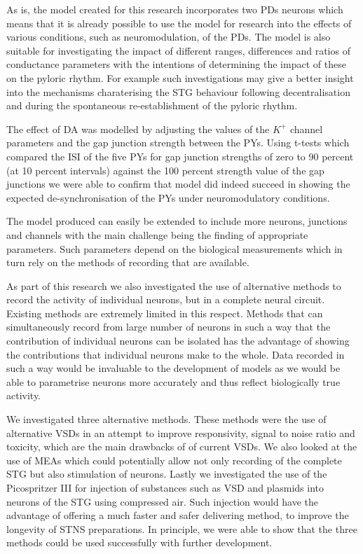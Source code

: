 As is, the model created for this research incorporates two \acp{PD} neurons which means that it is already possible to use the model for research into the effects of various conditions, such as neuromodulation, of the \acp{PD}. The model is also suitable for investigating the impact of different ranges, differences and ratios of conductance parameters with the intentions of determining the impact of these on the pyloric rhythm. For example such investigations may give a better insight into the mechanisms
 charaterising the \ac{STG} behaviour following decentralisation and during the spontaneous re-establishment of the pyloric rhythm.

The effect of \ac{DA} was modelled by adjusting the values of the $K^{+}$ channel parameters and the gap junction strength between the \acp{PY}. Using t-tests which compared the \ac{ISI} of the five \acp{PY} for gap junction strengths of zero to 90 percent (at 10 percent intervals) against the 100 percent strength value of the gap junctions we were able to confirm that model did indeed succeed in showing the expected de-synchronisation of the \acp{PY} under neuromodulatory conditions.

The model produced can easily be extended to include more neurons, junctions and channels with the main challenge being the finding of appropriate parameters. Such parameters depend on the biological measurements which in turn rely on the methods of recording that are available.

As part of this research we also investigated the use of alternative methods to record the  activity of individual neurons, but in a complete neural circuit. Existing methods are extremely limited in this respect. Methods that can simultaneously record from large number of neurons in such a way that the contribution of individual neurons can be isolated has the advantage of showing the contributions that individual neurons make to the whole. Data recorded in such a way would be invaluable to the development of models as we would be able to parametrise neurons  more accurately and thus reflect biologically true activity.

We investigated three alternative methods. These methods were the use of alternative \acp{VSD} in an attempt to improve responsivity, signal to noise ratio and toxicity, which are the main drawbacks of of current \acp{VSD}. We also looked at the use of \acp{MEA} which could potentially allow not only recording of the complete \ac{STG} but also stimulation of neurons. Lastly we investigated the use of the Picospritzer III for injection of substances such as \ac{VSD} and plasmids into neurons of the \ac{STG} using compressed air. Such injection would have the advantage of offering a much faster and safer delivering method, to improve the longevity of \ac{STNS} preparations. In principle, we were able to show that the three methods could be used successfully with further development.

